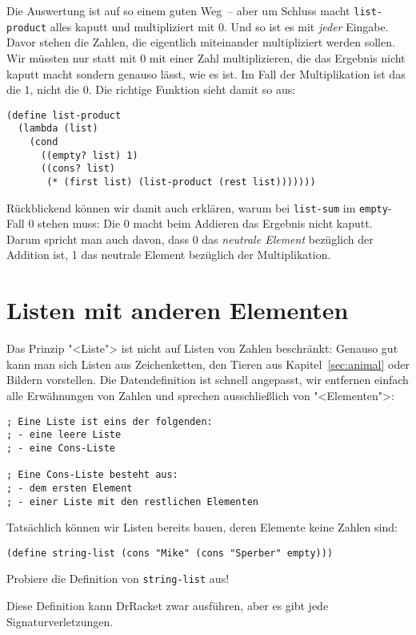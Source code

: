 %
Die Auswertung ist auf so einem guten Weg~-- aber um Schluss macht
\lstinline{list-product} alles kaputt und multipliziert mit 0.  Und so
ist es mit \emph{jeder} Eingabe.  Davor stehen die Zahlen, die
eigentlich miteinander multipliziert werden sollen.  Wir müssten nur
statt mit 0 mit einer Zahl multiplizieren, die das Ergebnis nicht
kaputt macht sondern genauso lässt, wie es ist.  Im Fall der
Multiplikation ist das die 1, nicht die 0.  Die richtige Funktion
sieht damit so aus:
%
\begin{lstlisting}
(define list-product
  (lambda (list)
    (cond
      ((empty? list) 1)
      ((cons? list)
       (* (first list) (list-product (rest list)))))))
\end{lstlisting}
%
Rückblickend können wir damit auch erklären, warum bei
\lstinline{list-sum} im \lstinline{empty}-Fall 0 stehen muss: Die 0
macht beim Addieren das Ergebnis nicht kaputt.  Darum spricht man auch
davon, dass 0 das \textit{neutrale Element}
bezüglich der Addition ist, 1 das neutrale Element bezüglich der
Multiplikation.

\section{Listen mit anderen Elementen}

Das Prinzip "<Liste"> ist nicht auf Listen von Zahlen beschränkt:
Genauso gut kann man sich Listen aus Zeichenketten, den Tieren aus
Kapitel~\ref{sec:animal} oder Bildern vorstellen.  Die Datendefinition
ist schnell angepasst, wir entfernen einfach alle Erwähnungen von
Zahlen und sprechen ausschließlich von "<Elementen">:
%
\begin{lstlisting}
; Eine Liste ist eins der folgenden:
; - eine leere Liste
; - eine Cons-Liste

; Eine Cons-Liste besteht aus:
; - dem ersten Element
; - einer Liste mit den restlichen Elementen
\end{lstlisting}
%
Tatsächlich können wir Listen bereits bauen, deren Elemente keine
Zahlen sind:
%
\begin{lstlisting}
(define string-list (cons "Mike" (cons "Sperber" empty)))
\end{lstlisting}
%
\begin{aufgabe}
  Probiere die Definition von \lstinline{string-list} aus!
\end{aufgabe}
%
Diese Definition kann DrRacket zwar ausführen, aber es gibt jede
Signaturverletzungen.

